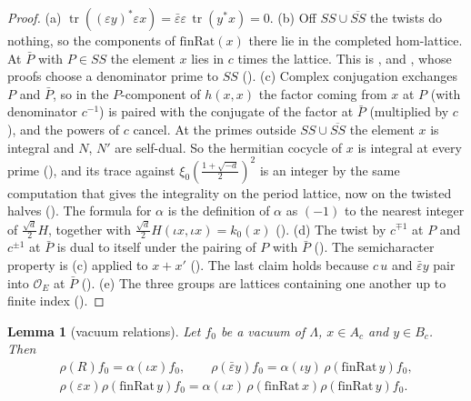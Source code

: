 \documentclass[11pt]{article}
\newcommand{\OEr}{\mathcal O_E}
\newcommand{\tr}{\operatorname{tr}}
\newtheorem{lemma}[theorem]{Lemma}
\theoremstyle{remark}
\begin{document}
\begin{proof}
(a) $\tr((\varepsilon y)^*\varepsilon x)=\bar\varepsilon\varepsilon\,\tr(y^*x)=0$. (b) Off $SS\cup\overline{SS}$ the twists do nothing, so the components of $\mathrm{finRat}(x)$ there lie in the completed hom-lattice. At $\bar P$ with $P\in SS$ the element $x$ lies in $c$ times the lattice. This is ,  and , whose proofs choose a denominator prime to $SS$ (). (c) Complex conjugation exchanges $P$ and $\bar P$, so in the $P$-component of $h(x,x)$ the factor coming from $x$ at $P$ (with denominator $c^{-1}$) is paired with the conjugate of the factor at $\bar P$ (multiplied by $c$), and the powers of $c$ cancel. At the primes outside $SS\cup\overline{SS}$ the element $x$ is integral and $N$, $N'$ are self-dual. So the hermitian cocycle of $x$ is integral at every prime (), and its trace against $\xi_0(\frac{1+\sqrt{-d}}2)^2$ is an integer by the same computation that gives the integrality on the period lattice, now on the twisted halves (). The formula for $\alpha$ is the definition of $\alpha$ as $(-1)$ to the nearest integer of $\tfrac{\sqrt d}2H$, together with $\tfrac{\sqrt d}2H(\iota x,\iota x)=k_0(x)$ (). (d) The twist by $c^{\mp1}$ at $P$ and $c^{\pm1}$ at $\bar P$ is dual to itself under the pairing of $P$ with $\bar P$ (). The semicharacter property is (c) applied to $x+x'$ (). The last claim holds because $c\,u$ and $\bar\varepsilon y$ pair into $\OEr$ at $\bar P$ (). (e) The three groups are lattices containing one another up to finite index ().
\end{proof}

\begin{lemma}[vacuum relations]\label{lem:vac}
Let $f_0$ be a vacuum of $\Lambda$, $x\in A_c$ and $y\in B_c$. Then
\begin{gather*}
\rho(R)f_0=\alpha(\iota x)f_0,\qquad \rho(\bar\varepsilon y)f_0=\alpha(\iota y)\,\rho(\mathrm{finRat}\,y)f_0,\\
\rho(\varepsilon x)\rho(\mathrm{finRat}\,y)f_0=\alpha(\iota x)\,\rho(\mathrm{finRat}\,x)\rho(\mathrm{finRat}\,y)f_0 .
\end{gather*}
\end{lemma}
\end{document}
